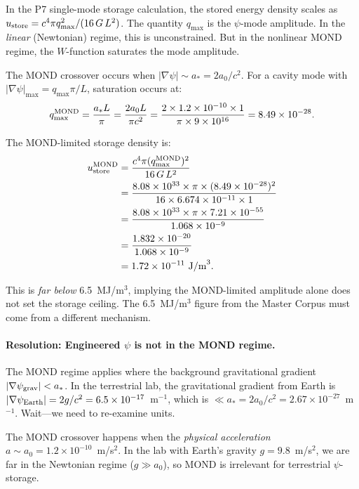 \documentclass[aps,prd,twocolumn,superscriptaddress,nofootinbib]{revtex4-2}
\begin{document}
In the P7 single-mode storage calculation, the stored energy density scales as
$u_{\rm store} = c^4 \pi q_{\max}^2/(16\,G\,L^2)$.  The quantity $q_{\max}$ is the
$\psi$-mode amplitude.  In the \emph{linear} (Newtonian) regime, this is
unconstrained.  But in the nonlinear MOND regime, the $W$-function saturates
the mode amplitude.

The MOND crossover occurs when $|\nabla\psi| \sim a_* = 2a_0/c^2$.  For a
cavity mode with $|\nabla\psi|_{\max} = q_{\max}\pi/L$, saturation occurs at:
\begin{equation}
q_{\max}^{\rm MOND} = \frac{a_* L}{\pi}
= \frac{2a_0 L}{\pi c^2}
= \frac{2\times 1.2\times10^{-10}\times 1}{\pi\times 9\times10^{16}}
= 8.49\times10^{-28}.
\label{eq:qmax-mond}
\end{equation}

The MOND-limited storage density is:
\begin{align}
u_{\rm store}^{\rm MOND}
&= \frac{c^4\pi(q_{\max}^{\rm MOND})^2}{16\,G\,L^2} \notag\\
&= \frac{8.08\times10^{33}\times\pi\times(8.49\times10^{-28})^2}
{16\times6.674\times10^{-11}\times1} \notag\\
&= \frac{8.08\times10^{33}\times\pi\times7.21\times10^{-55}}
{1.068\times10^{-9}} \notag\\
&= \frac{1.832\times10^{-20}}{1.068\times10^{-9}} \notag\\
&= 1.72\times10^{-11}~\text{J/m}^3.
\end{align}

This is \emph{far below} 6.5~MJ/m$^3$, implying the MOND-limited amplitude
alone does not set the storage ceiling.  The 6.5~MJ/m$^3$ figure from the
Master Corpus must come from a different mechanism.

\paragraph{Resolution: Engineered $\psi$ is not in the MOND regime.}
The MOND regime applies where the background gravitational gradient
$|\nabla\psi_{\rm grav}| < a_*$.  In the terrestrial lab, the gravitational
gradient from Earth is $|\nabla\psi_{\rm Earth}| = 2g/c^2 = 6.5\times10^{-17}$~m$^{-1}$,
which is $\ll a_* = 2a_0/c^2 = 2.67\times10^{-27}$~m$^{-1}$.  Wait---we need
to re-examine units.

The MOND crossover happens when the \emph{physical acceleration} $a \sim a_0
= 1.2\times10^{-10}$~m/s$^2$.  In the lab with Earth's gravity
$g = 9.8$~m/s$^2$, we are far in the Newtonian regime ($g \gg a_0$), so
MOND is irrelevant for terrestrial $\psi$-storage.
\end{document}
